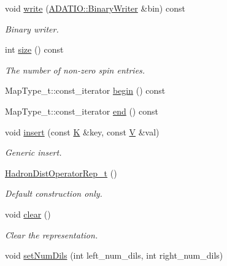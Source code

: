 \begin{DoxyCompactItemize}
void \mbox{\hyperlink{classHadron_1_1HadronDistOperatorRep__t_a13c4b6d851e65136c55ccee152e72a12}{write}} (\mbox{\hyperlink{classADATIO_1_1BinaryWriter}{A\+D\+A\+T\+I\+O\+::\+Binary\+Writer}} \&bin) const
\begin{DoxyCompactList}\small\item\em Binary writer. \end{DoxyCompactList}\item 
int \mbox{\hyperlink{classHadron_1_1HadronDistOperatorRep__t_aa29061d2a7319319dd6ea0a918acd8db}{size}} () const
\begin{DoxyCompactList}\small\item\em The number of non-\/zero spin entries. \end{DoxyCompactList}\item 
Map\+Type\+\_\+t\+::const\+\_\+iterator \mbox{\hyperlink{classHadron_1_1HadronDistOperatorRep__t_a77caca753b9c9b1d433898627e6bd3de}{begin}} () const
\item 
Map\+Type\+\_\+t\+::const\+\_\+iterator \mbox{\hyperlink{classHadron_1_1HadronDistOperatorRep__t_ae811537842e96e1161375ffe7dd65ca2}{end}} () const
\item 
void \mbox{\hyperlink{classHadron_1_1HadronDistOperatorRep__t_a05856fbd2f2205ddc461685d987713b9}{insert}} (const \mbox{\hyperlink{classHadron_1_1HadronDistOperatorRep__t_a670c7409bfd80616aeb0159590bcdb6b}{K}} \&key, const \mbox{\hyperlink{classHadron_1_1HadronDistOperatorRep__t_a40f37383ae57b1d0bbf944d698a10382}{V}} \&val)
\begin{DoxyCompactList}\small\item\em Generic insert. \end{DoxyCompactList}\item 
\mbox{\hyperlink{classHadron_1_1HadronDistOperatorRep__t_a697bc290991416e1c06d018553c1d9b7}{Hadron\+Dist\+Operator\+Rep\+\_\+t}} ()
\begin{DoxyCompactList}\small\item\em Default construction only. \end{DoxyCompactList}\item 
void \mbox{\hyperlink{classHadron_1_1HadronDistOperatorRep__t_a8d4c5288c2e0dd19b4af4127eb26a9cd}{clear}} ()
\begin{DoxyCompactList}\small\item\em Clear the representation. \end{DoxyCompactList}\item 
void \mbox{\hyperlink{classHadron_1_1HadronDistOperatorRep__t_adde38342364887f39b718d5ab981cd1e}{set\+Num\+Dils}} (int left\+\_\+num\+\_\+dils, int right\+\_\+num\+\_\+dils)

\end{DoxyCompactItemize}
